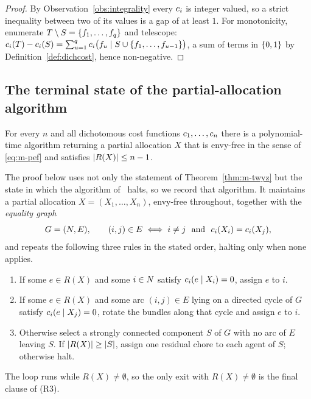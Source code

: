 \begin{proof}
By Observation~\ref{obs:integrality} every $c_i$ is integer valued, so a
strict inequality between two of its values is a gap of at least $1$. For
monotonicity, enumerate $T \setminus S = \left\{f_1,\dots,f_q\right\}$ and telescope:
$c_i(T) - c_i(S) = \sum_{u=1}^{q} c_i\bigl(f_u \mid S \cup
\left\{f_1,\dots,f_{u-1}\right\}\bigr)$, a sum of terms in $\left\{0,1\right\}$ by
Definition~\ref{def:dichcost}, hence non-negative.
\end{proof}

\subsection{The terminal state of the partial-allocation algorithm}
\label{sec:m-terminal}

\begin{theorem}
\label{thm:m-twyz}
For every $n$ and all dichotomous cost functions $c_1,\dots,c_n$ there
is a polynomial-time algorithm returning a partial allocation $X$ that is
envy-free in the sense of \eqref{eq:m-pef} and satisfies
$\left\lvert R(X)\right\rvert \le n-1$.
\end{theorem}

The proof below uses not only the statement of Theorem~\ref{thm:m-twyz} but the
state in which the algorithm of~\cite{TWYZ23} halts, so we record that
algorithm. It maintains a partial allocation $X = (X_1,\dots,X_n)$, envy-free
throughout, together with the \emph{equality graph}
\begin{equation}
\label{eq:m-graph}
  G = (N, E),
  \qquad
  (i,j) \in E \iff i \ne j \ \text{ and } \ c_i(X_i) = c_i(X_j),
\end{equation}
and repeats the following three rules in the stated order, halting only when
none applies.
\begin{enumerate}
  \item[(R1)] If some $e \in R(X)$ and some $i \in N$ satisfy
        $c_i(e \mid X_i) = 0$, assign $e$ to $i$.
  \item[(R2)] If some $e \in R(X)$ and some arc $(i,j) \in E$ lying on a
        directed cycle of $G$ satisfy $c_i(e \mid X_j) = 0$, rotate the
        bundles along that cycle and assign $e$ to $i$.
  \item[(R3)] Otherwise select a strongly connected component $S$ of $G$ with
        no arc of $E$ leaving $S$. If $\left\lvert R(X)\right\rvert \ge \left\lvert S\right\rvert$, assign one
        residual chore to each agent of $S$; otherwise halt.
\end{enumerate}
The loop runs while $R(X) \ne \emptyset$, so the only exit with
$R(X) \ne \emptyset$ is the final clause of (R3).

